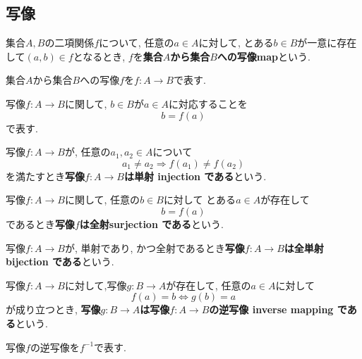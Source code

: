 \subsection{写像}
\begin{Def}
集合$A,B$の二項関係$f$について,
任意の$a\in A$に対して, とある$b\in B$が一意に存在して$(a,b)\in f$となるとき,
$f$を{\bf 集合$A$から集合$B$への写像map}という.
\end{Def}
\begin{Notation}
集合$A$から集合$B$への写像$f$を$f:A\rightarrow B$で表す.
\end{Notation}
\begin{comment}
\begin{caution}
以下では, 「{\bf 関数 function\index{かんすう@関数}}」と「写像」を同じ意味で用いる.
\end{caution}
\end{comment}
\begin{Notation}
写像$f:A\rightarrow B$に関して, $b\in B$が$a\in A$に対応することを
\[
b=f(a)
\]
で表す.
\end{Notation}
\begin{Def}
写像$f:A\rightarrow B$が,
任意の$a_1,a_2\in A$について
\[
a_1\neq a_2\Rightarrow f(a_1)\neq f(a_2)
\]
を満たすとき{\bf 写像$f:A\rightarrow B$は単射 injection である}という.
\end{Def}
\begin{Def}
写像$f:A\rightarrow B$に関して,
任意の$b\in B$に対して
とある$a\in A$が存在して
\[
b=f(a)
\]
であるとき{\bf 写像$f$は全射surjection である}という.
\end{Def}
\begin{Def}
写像$f:A\rightarrow B$が, 単射であり, かつ全射であるとき{\bf 写像$f:A\rightarrow B$は全単射 bijection である}という.
\end{Def}

\begin{Def}
写像$f:A\rightarrow B$に対して,写像$g:B\rightarrow A$が存在して, 任意の$a\in A$に対して
\[
f(a)=b \Leftrightarrow g(b)=a
\]
が成り立つとき, {\bf 写像$g:B\rightarrow A$は写像$f:A\rightarrow B$の逆写像 inverse mapping である}という.
\end{Def}
\begin{Notation}
写像$f$の逆写像を$f^{-1}$で表す.
\end{Notation}

